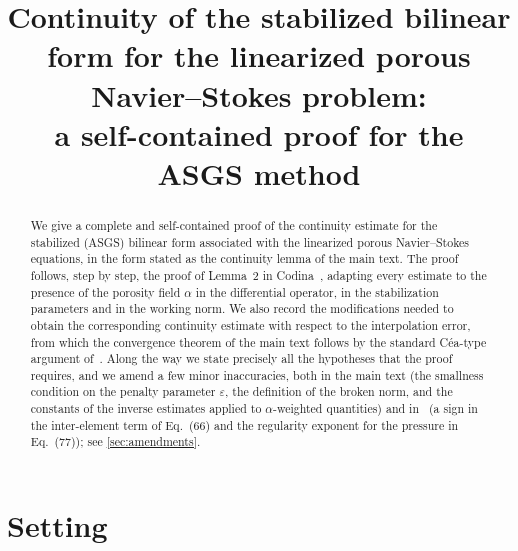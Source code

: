 \documentclass[11pt,a4paper]{article}
\title{Continuity of the stabilized bilinear form for the linearized porous
Navier--Stokes problem:\\ a self-contained proof for the ASGS method}
\author{}
\date{}
\theoremstyle{plain}
\theoremstyle{remark}
\theoremstyle{definition}
\numberwithin{equation}{section}
\begin{document}
\maketitle
\vspace{-3em}

\begin{abstract}
\noindent We give a complete and self-contained proof of the continuity estimate for the
stabilized (ASGS) bilinear form associated with the linearized porous Navier--Stokes
equations, in the form stated as the continuity lemma of the main text. The proof follows,
step by step, the proof of Lemma~2 in Codina~\cite{codina2001}, adapting every estimate to
the presence of the porosity field $\alpha$ in the differential operator, in the
stabilization parameters and in the working norm. We also record the modifications needed
to obtain the corresponding continuity estimate with respect to the interpolation error,
from which the convergence theorem of the main text follows by the standard
C\'{e}a-type argument of~\cite{codina2001}. Along the way we state precisely all the
hypotheses that the proof requires, and we amend a few minor inaccuracies, both in the main
text (the smallness condition on the penalty parameter $\varepsilon$, the definition of the
broken norm, and the constants of the inverse estimates applied to $\alpha$-weighted
quantities) and in~\cite{codina2001} (a sign in the inter-element term of Eq.~(66) and the
regularity exponent for the pressure in Eq.~(77)); see \cref{sec:amendments}.
\end{abstract}

\section{Setting}\label{sec:setting}
\end{document}

